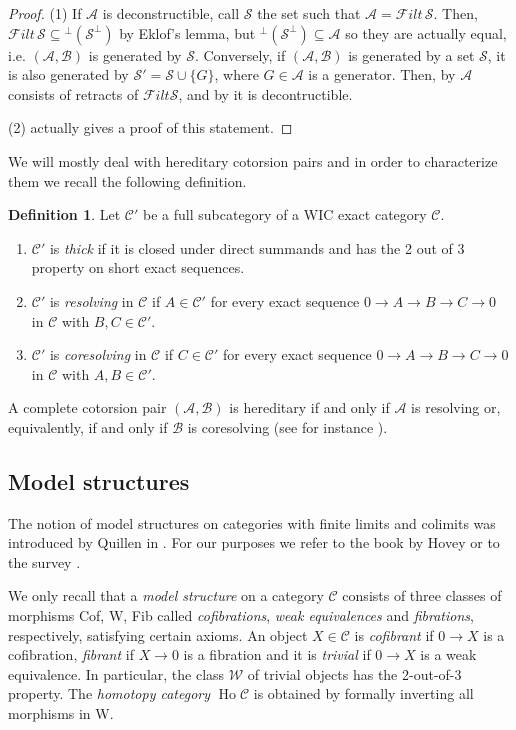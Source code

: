\documentclass[11pt,a4paper,reqno]{amsart}
\renewcommand{\iff}{if and only if }
\newcommand{\A}{\mathcal{A}}
\newcommand{\B}{\mathcal{B}}
\newcommand{\C}{\mathcal{C}}
\newcommand{\F}{\mathcal{F}}
\newcommand{\clS}{\mathcal{S}}
\newcommand{\W}{\mathcal{W}}
\newcommand{\Ho}{\operatorname{Ho}}
\theoremstyle{plain}
\theoremstyle{definition}
\newtheorem{defn}[thm]{Definition}
\theoremstyle{remark}
\begin{document}
\begin{proof}
  (1) If $\A$ is deconstructible, call $\clS$ the set such that $\A = \F ilt\,\clS$. Then, $\F ilt\,\clS \subseteq {^\perp(\clS^\perp)}$ by Eklof's lemma, but ${^\perp(\clS^\perp)}\subseteq\A$ so they are actually equal, i.e. $(\A,\B)$ is generated by $\clS$.
  Conversely, if $(\A,\B)$ is generated by a set $\clS$, it is also generated by $\clS'=\clS\cup\{G\}$, where $G\in\A$ is a generator. Then, by \cite[Theorem~5.16]{Sto13} $\A$ consists of retracts of $\F ilt \clS$, and by \cite[Proposition~2.9(1)]{St10-deconstr} it is decontructible.

  (2) \cite[Theorem~5.16]{Sto13} actually gives a proof of this statement.
\end{proof}

%


We will mostly deal with  hereditary cotorsion pairs and
in order to characterize them we recall the following definition.
\begin{defn}\label{D:thick} Let $\C'$ be  a full subcategory of a WIC exact category $\C$.
\begin{enumerate}
\item $\C'$ is \emph{thick} if it is closed under direct summands and has the 2 out of 3 property on short exact sequences.
\item $\C'$ is \emph{resolving} in $\C$ if $A\in \C'$ for every exact sequence $0\to A\to B\to C\to 0$ in $\C$ with $B, C\in \C'$.
\item $\C'$ is \emph{coresolving} in $\C$ if $C\in \C'$ for every exact sequence $0\to A\to B\to C\to 0$ in $\C$ with $A, B\in \C'$.
\end{enumerate}
\end{defn}

A complete cotorsion pair $(\A, \B)$ is hereditary \iff $\A$ is resolving or, equivalently, \iff $\B$ is coresolving  (see for instance \cite[Lemma 6.17]{Sto13}).

%
%
%

\subsection{Model structures}\label{S:model}
The notion of model structures on categories with finite limits and colimits was introduced by Quillen in \cite{QHtp}.
For our purposes we refer to the book by Hovey \cite{Hov99} or to the survey \cite{Sto13}.

We only recall that a \emph{model structure} on a category $\C$ consists
of three classes of morphisms Cof, W, Fib called \emph{cofibrations}, \emph{weak equivalences} and \emph{fibrations}, respectively, satisfying certain axioms. An object $X\in \C$ is \emph{cofibrant} if $0\to X$ is a cofibration,  \emph{fibrant} if $X\to 0$ is a fibration and it is \emph{trivial} if $0\to X$ is a weak equivalence.
In particular, the class $\W$ of trivial objects has the 2-out-of-3 property.
 The \emph{homotopy category} $\Ho \C$ is obtained by  formally inverting all morphisms in W.
\end{document}

